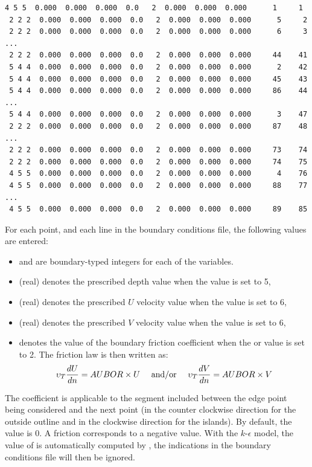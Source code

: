 \begin{lstlisting}[language=bash]
 4 5 5  0.000  0.000  0.000  0.0   2  0.000  0.000  0.000      1     1
 2 2 2  0.000  0.000  0.000  0.0   2  0.000  0.000  0.000      5     2
 2 2 2  0.000  0.000  0.000  0.0   2  0.000  0.000  0.000      6     3
...
 2 2 2  0.000  0.000  0.000  0.0   2  0.000  0.000  0.000     44    41
 5 4 4  0.000  0.000  0.000  0.0   2  0.000  0.000  0.000      2    42
 5 4 4  0.000  0.000  0.000  0.0   2  0.000  0.000  0.000     45    43
 5 4 4  0.000  0.000  0.000  0.0   2  0.000  0.000  0.000     86    44
...
 5 4 4  0.000  0.000  0.000  0.0   2  0.000  0.000  0.000      3    47
 2 2 2  0.000  0.000  0.000  0.0   2  0.000  0.000  0.000     87    48
...
 2 2 2  0.000  0.000  0.000  0.0   2  0.000  0.000  0.000     73    74
 2 2 2  0.000  0.000  0.000  0.0   2  0.000  0.000  0.000     74    75
 4 5 5  0.000  0.000  0.000  0.0   2  0.000  0.000  0.000      4    76
 4 5 5  0.000  0.000  0.000  0.0   2  0.000  0.000  0.000     88    77
...
 4 5 5  0.000  0.000  0.000  0.0   2  0.000  0.000  0.000     89    85
\end{lstlisting}

For each point, and each line in the boundary conditions file, the following
values are entered:


\begin{itemize}
\item  {} and  are boundary-typed
integers for each of the variables.

\item {} (real) denotes the prescribed depth value when the
 value is set to 5,

\item {} (real) denotes the prescribed $U$ velocity value when
the  value is set to 6,

\item {} (real) denotes the prescribed $V$ velocity value when
the  value is set to 6,

\item {} denotes the value of the boundary friction coefficient when
the  or  value is set to 2.
The friction law is then written as:
\begin{align}
\upsilon_{T} \frac{dU}{dn} = AUBOR \times U {\rm ~~~~and/or~~~~ }
\upsilon_{T} \frac{dV}{dn} = AUBOR \times V
\end{align}
\end{itemize}
The  coefficient is applicable to the segment included between
the edge point being considered and the next point (in the counter clockwise
direction for the outside outline and in the clockwise direction for the islands).
By default, the  value is 0.
A friction corresponds to a negative value.
With the $k$-$\epsilon$ model, the value of  is automatically
computed by , the indications in the boundary conditions file will
then be ignored.

